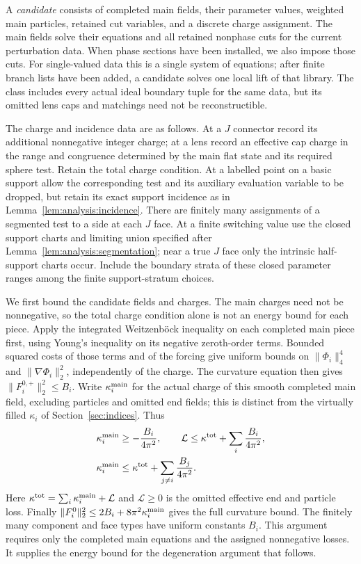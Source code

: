 A \emph{candidate} consists of completed main fields, their parameter
values, weighted main particles, retained cut variables, and a discrete
charge assignment.  The main fields solve their equations and all
retained nonphase cuts for the current perturbation data.  When phase
sections have been installed, we also impose those cuts.  For
single-valued data this is a single system of equations; after finite
branch lists have been added, a candidate solves one local lift of that
library.  The class includes every actual ideal boundary tuple for the
same data, but its omitted lens caps and matchings need not be reconstructible.

The charge and incidence data are as follows.  At a $J$ connector
record its additional nonnegative integer charge; at a lens record an
effective cap charge in the range and congruence determined by the
main flat state and its required sphere test.  Retain the total charge
condition.  At a labelled point on a basic support allow the
corresponding test and its auxiliary evaluation variable to be dropped,
but retain its exact support incidence
as in Lemma~\ref{lem:analysis:incidence}.  There are finitely many
assignments of a segmented test to a side at each $J$ face.
At a finite switching value use the closed support charts and limiting
union specified after Lemma~\ref{lem:analysis:segmentation}; near a true
$J$ face only the intrinsic half-support charts occur.  Include the
boundary strata of these closed parameter ranges among the finite
support-stratum choices.

We first bound the candidate fields and charges.  The main charges
need not be nonnegative, so the total charge condition alone is not
an energy bound for each piece.  Apply the integrated Weitzenb\"ock
inequality on each completed main piece first, using
Young's inequality on its negative zeroth-order terms.  Bounded
squared costs of those terms and of the forcing give uniform bounds
on $\|\Phi_i\|_4^4$ and $\|\nabla\Phi_i\|_2^2$, independently of
the charge.  The curvature equation then gives
$\|F_i^{0,+}\|_2^2\leq B_i$.  Write
$\kappa_i^{\rm main}$ for the actual charge of this smooth completed
main field, excluding particles and omitted end fields; this is
distinct from the virtually filled $\kappa_i$ of
Section~\ref{sec:indices}.  Thus
\begin{align}\label{eq:analysis:candidate-energy-order}
 \kappa_i^{\rm main}&\geq-\frac{B_i}{4\pi^2},\qquad
 \mathcal L\leq\kappa^{\rm tot}+\sum_i\frac{B_i}{4\pi^2},\notag\\
 \kappa_i^{\rm main}&\leq\kappa^{\rm tot}+
                         \sum_{j\ne i}\frac{B_j}{4\pi^2}.
\end{align}
Here $\kappa^{\rm tot}=\sum_i\kappa_i^{\rm main}+\mathcal L$ and
$\mathcal L\geq0$ is the omitted effective end and particle loss.
Finally
$\|F_i^0\|_2^2\leq2B_i+8\pi^2\kappa_i^{\rm main}$ gives the full curvature
bound.  The finitely many component and face types have uniform
constants $B_i$.  This argument requires only the completed main
equations and the assigned nonnegative losses.  It supplies the energy
bound for the degeneration argument that follows.

